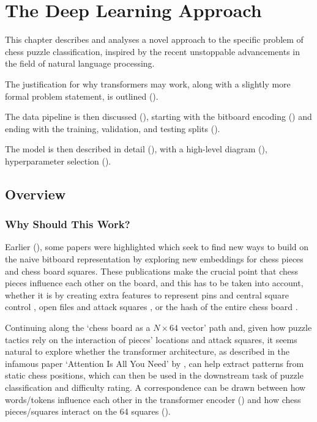 \chapter{The Deep Learning Approach}\label{mlChapter}

This chapter describes and analyses a novel approach to the specific problem of
chess puzzle classification, inspired by the recent unstoppable advancements in
the field of natural language processing.

The justification for why transformers may work, along with a slightly more
formal problem statement, is outlined ().

The data pipeline is then discussed (), starting with the bitboard
encoding () and ending with the training, validation, and testing
splits ().

The model is then described in detail (), with a high-level diagram
(), hyperparameter selection ().

\section{Overview}\label{mlS0}

\subsection{Why Should This Work?}

Earlier (), some papers were highlighted which seek to find new ways
to build on the naive bitboard representation by exploring new embeddings for
chess pieces and chess board squares. These publications make the crucial point
that chess pieces influence each other on the board, and this has to be taken
into account, whether it is by creating extra features to represent pins and
central square control \citep{chessCNN}, open files and attack squares
\citep{middleGamePatterns}, or the hash of the entire chess board
\cite{chess2vec}.

Continuing along the `chess board as a $N\times64$ vector' path and, given how
puzzle tactics rely on the interaction of pieces' locations and attack squares,
it seems natural to explore whether the transformer architecture, as described
in the infamous paper `Attention Is All You Need' by \citet{attention}, can
help extract patterns from static chess positions, which can then be used in
the downstream task of puzzle classification and difficulty rating. A
correspondence can be drawn between how words/tokens influence each other in
the transformer encoder () and how chess pieces/squares
interact on the 64 squares ().

